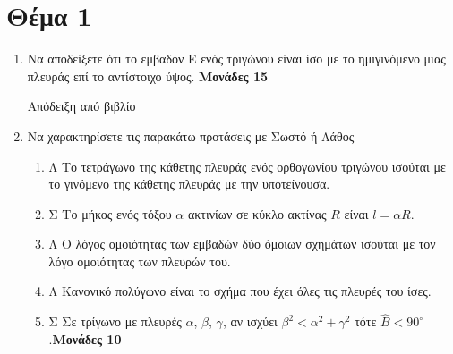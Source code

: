 \documentclass[12pt]{extarticle}
\begin{document}
\renewcommand{\labelenumi}{\alph{enumi})}
\renewcommand{\labelenumii}{\roman{enumii}.}

\section*{Θέμα 1}
\noindent

\begin{enumerate}
    \item Να αποδείξετε ότι το εμβαδόν Ε ενός τριγώνου είναι ίσο με το ημιγινόμενο μιας πλευράς επί το αντίστοιχο ύψος. \hspace*{\fill} \textbf{Μονάδες 15}

          Απόδειξη από βιβλίο
    \item Να χαρακτηρίσετε τις παρακάτω προτάσεις με Σωστό ή Λάθος
          \begin{enumerate}
              \item Λ Το τετράγωνο της κάθετης πλευράς ενός ορθογωνίου τριγώνου ισούται με το γινόμενο της κάθετης πλευράς με την υποτείνουσα.
              \item Σ Το μήκος ενός τόξου $α$ ακτινίων σε κύκλο ακτίνας $R$ είναι $l=αR$.
              \item Λ Ο λόγος ομοιότητας των εμβαδών δύο όμοιων σχημάτων ισούται με τον λόγο ομοιότητας των πλευρών του.
              \item Λ Κανονικό πολύγωνο είναι το σχήμα που έχει όλες τις πλευρές του ίσες.
              \item Σ Σε τρίγωνο με πλευρές $α$, $β$, $γ$, αν ισχύει $β^2<α^2+γ^2$ τότε $\hat{Β}<90^{\circ}$.\hspace*{\fill}\textbf{Μονάδες 10}
          \end{enumerate}
\end{enumerate}
\end{document}
